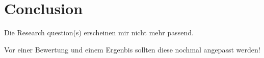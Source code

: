 \chapter{Conclusion}
\label{chap:conclusion}

Die Research question(s) erscheinen mir nicht mehr passend.

Vor einer Bewertung und einem Ergenbis sollten diese nochmal angepasst werden!